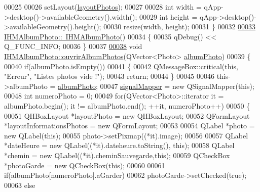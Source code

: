 \begin{DoxyCode}
00025 
00026     setLayout(\hyperlink{class_i_h_m_album_photo_aabe492a016823fa63259c8e5d5b58e9d}{layoutPhotos});
00027 
00028     \textcolor{keywordtype}{int} width = qApp->desktop()->availableGeometry().width();
00029     \textcolor{keywordtype}{int} height = qApp->desktop()->availableGeometry().height();
00030     resize(width, height);
00031 \}
00032 
\hyperlink{class_i_h_m_album_photo_a02812cbcaa5467a2e6419ed9d5904cc6}{00033} \hyperlink{class_i_h_m_album_photo_a02812cbcaa5467a2e6419ed9d5904cc6}{IHMAlbumPhoto::~IHMAlbumPhoto}()
00034 \{
00035     qDebug() << Q\_FUNC\_INFO;
00036 \}
00037 
\hyperlink{class_i_h_m_album_photo_a5aa9a9c1b04e00eaec1581e92649535f}{00038} \textcolor{keywordtype}{void} \hyperlink{class_i_h_m_album_photo_a5aa9a9c1b04e00eaec1581e92649535f}{IHMAlbumPhoto::ouvrirAlbumPhotos}(QVector<Photo> 
      \hyperlink{class_i_h_m_album_photo_a686adeccd626a94d9a4996782c851c61}{albumPhoto})
00039 \{
00040     \textcolor{keywordflow}{if}(albumPhoto.isEmpty())
00041     \{
00042         QMessageBox::critical(\textcolor{keyword}{this}, \textcolor{stringliteral}{"Erreur"}, \textcolor{stringliteral}{"Listes photos vide !"});
00043         \textcolor{keywordflow}{return};
00044     \}
00045 
00046     this->albumPhoto = \hyperlink{class_i_h_m_album_photo_a686adeccd626a94d9a4996782c851c61}{albumPhoto};
00047     \hyperlink{class_i_h_m_album_photo_a184d7d26edab19328980b55ce727811b}{signalMapper} = \textcolor{keyword}{new} QSignalMapper(\textcolor{keyword}{this});
00048     \textcolor{keywordtype}{int} numeroPhoto = 0;
00049     \textcolor{keywordflow}{for}(QVector<Photo>::iterator it = albumPhoto.begin(); it != albumPhoto.end(); ++it, numeroPhoto++)
00050     \{
00051         QHBoxLayout *layoutPhoto = \textcolor{keyword}{new} QHBoxLayout;
00052         QFormLayout *layoutInformationsPhotos = \textcolor{keyword}{new} QFormLayout;
00053 
00054         QLabel *photo = \textcolor{keyword}{new} QLabel(\textcolor{keyword}{this});
00055         photo->setPixmap((*it).image);
00056 
00057         QLabel *dateHeure = \textcolor{keyword}{new} QLabel((*it).dateheure.toString(), \textcolor{keyword}{this});
00058         QLabel *chemin = \textcolor{keyword}{new} QLabel((*it).cheminSauvegarde,\textcolor{keyword}{this});
00059         QCheckBox *photoGarde = \textcolor{keyword}{new} QCheckBox(\textcolor{keyword}{this});
00060 
00061         \textcolor{keywordflow}{if}(albumPhoto[numeroPhoto].aGarder)
00062             photoGarde->setChecked(\textcolor{keyword}{true});
00063         \textcolor{keywordflow}{else}

\end{DoxyCode}
